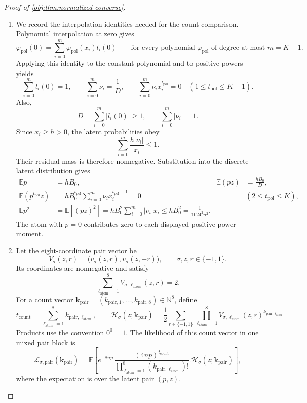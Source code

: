 \documentclass[11pt]{article}
\begin{document}
\begin{proof}[Proof of \cref{obj:thm:normalized-converse}]
\begin{enumerate}
\item
We record the interpolation identities needed for the count comparison. Polynomial interpolation at zero gives
\[
\varphi_{\mathrm{pol}}(0)
=\sum_{i=0}^{m}\varphi_{\mathrm{pol}}(x_i)l_i(0)
\qquad
\text{for every polynomial \(\varphi_{\mathrm{pol}}\) of degree at most \(m=K-1\)}.
\]
Applying this identity to the constant polynomial and to positive powers yields
\[
\sum_{i=0}^{m}l_i(0)=1,
\qquad
\sum_{i=0}^{m}\nu_i=\frac1D,
\qquad
\sum_{i=0}^{m}\nu_i x_i^{t_{\mathrm{pol}}}=0
\quad(1\le t_{\mathrm{pol}}\le K-1).
\]
Also,
\[
D=\sum_{i=0}^{m}|l_i(0)|\ge1,
\qquad
\sum_{i=0}^{m}|\nu_i|=1.
\]
Since \(x_i\ge h>0\), the latent probabilities obey
\[
\sum_{i=0}^{m}\frac{h|\nu_i|}{x_i}\le1.
\]
Their residual mass is therefore nonnegative. Substitution into the discrete latent distribution gives
\[
\begin{aligned}
\mathbb E p&=hB_0,
&
\mathbb E(pz)&=\frac{hB_0}{D},\\
\mathbb E(p^{t_{\mathrm{pol}}}z)
&=hB_0^{t_{\mathrm{pol}}}
  \sum_{i=0}^{m}\nu_i x_i^{t_{\mathrm{pol}}-1}
 =0
&& (2\le t_{\mathrm{pol}}\le K),\\
\mathbb E p^2
&=\mathbb E[(pz)^2]
 =hB_0^2\sum_{i=0}^{m}|\nu_i|x_i
 \le hB_0^2
 =\frac1{1024^2n^2}.
\end{aligned}
\]
The atom with \(p=0\) contributes zero to each displayed positive-power moment.

\item
Let the eight-coordinate pair vector be
\[
V_\sigma(z,r)
=\bigl(v_\sigma(z,r),v_\sigma(z,-r)\bigr),
\qquad
\sigma,z,r\in\{-1,1\}.
\]
Its coordinates are nonnegative and satisfy
\[
\sum_{\ell_{\mathrm{atom}}=1}^{8}
V_{\sigma,\ell_{\mathrm{atom}}}(z,r)=2.
\]
For a count vector
\(\boldsymbol{k}_{\mathrm{pair}}
=(k_{\mathrm{pair},1},\ldots,k_{\mathrm{pair},8})\in\mathbb N^8\),
define
\[
t_{\mathrm{count}}
=\sum_{\ell_{\mathrm{atom}}=1}^{8}k_{\mathrm{pair},\ell_{\mathrm{atom}}},
\qquad
\mathcal H_\sigma(z;\boldsymbol{k}_{\mathrm{pair}})
=\frac12\sum_{r\in\{-1,1\}}
 \prod_{\ell_{\mathrm{atom}}=1}^{8}
 V_{\sigma,\ell_{\mathrm{atom}}}(z,r)^{
 k_{\mathrm{pair},\ell_{\mathrm{atom}}}}
\]
Products use the convention \(0^0=1\). The likelihood of this count vector in one mixed pair block is
\[
\mathcal L_{\sigma,\mathrm{pair}}
(\boldsymbol{k}_{\mathrm{pair}})
=
\mathbb E\!\left[
e^{-8np}\,
\frac{(4np)^{t_{\mathrm{count}}}}
     {\prod_{\ell_{\mathrm{atom}}=1}^{8}
       (k_{\mathrm{pair},\ell_{\mathrm{atom}}})!}
\,
\mathcal H_\sigma(z;\boldsymbol{k}_{\mathrm{pair}})
\right],
\]
where the expectation is over the latent pair \((p,z)\).


\end{enumerate}
\end{proof}
\end{document}

